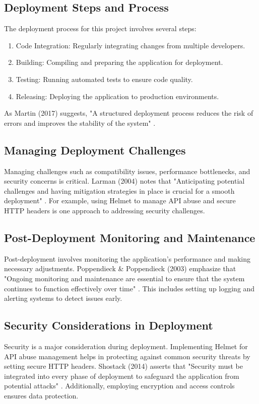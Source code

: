 \subsection{Deployment Steps and Process}
The deployment process for this project involves several steps:
\begin{enumerate}
    \item Code Integration: Regularly integrating changes from multiple developers.
    \item Building: Compiling and preparing the application for deployment.
    \item Testing: Running automated tests to ensure code quality.
    \item Releasing: Deploying the application to production environments.
\end{enumerate}
As Martin (2017) suggests, "A structured deployment process reduces the risk of errors and improves the stability of the system" \cite{martin2017clean}.

\subsection{Managing Deployment Challenges}
Managing challenges such as compatibility issues, performance bottlenecks, and security concerns is critical. Larman (2004) notes that "Anticipating potential challenges and having mitigation strategies in place is crucial for a smooth deployment" \cite{larman2004applying}. For example, using Helmet to manage API abuse and secure HTTP headers is one approach to addressing security challenges.

\subsection{Post-Deployment Monitoring and Maintenance}
Post-deployment involves monitoring the application’s performance and making necessary adjustments. Poppendieck \& Poppendieck (2003) emphasize that "Ongoing monitoring and maintenance are essential to ensure that the system continues to function effectively over time" \cite{poppendieck2003lean}. This includes setting up logging and alerting systems to detect issues early.

\subsection{Security Considerations in Deployment}
Security is a major consideration during deployment. Implementing Helmet for API abuse management helps in protecting against common security threats by setting secure HTTP headers. Shostack (2014) asserts that "Security must be integrated into every phase of deployment to safeguard the application from potential attacks" \cite{shostack2014threat}. Additionally, employing encryption and access controls ensures data protection.

